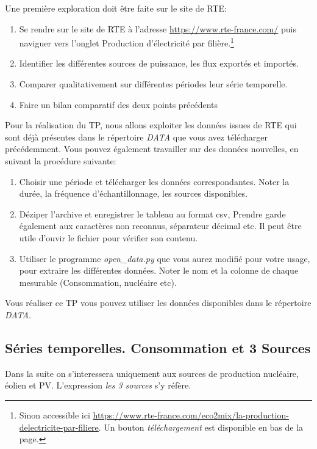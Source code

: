 \documentclass[12pt,a4,french]{article}
\newcommand{\tmtextit}[1]{{\itshape{#1}}}
\begin{document}
Une première exploration doit être faite sur le site de RTE:
\begin{enumerate}
  \item Se rendre sur le site de RTE à l'adresse 
  \href{https://www.rte-france.com/}{https://www.rte-france.com/} puis naviguer vers l'onglet Production d'électricité par filière.\footnote{Sinon accessible ici \href{https://www.rte-france.com/eco2mix/la-production-delectricite-par-filiere}{https://www.rte-france.com/eco2mix/la-production-delectricite-par-filiere}. Un bouton \textit{téléchargement} est disponible en bas de la page.}
  
  \item Identifier les différentes sources de puissance, les flux exportés et importés.
  
  \item Comparer qualitativement sur différentes périodes leur série temporelle.
  
  \item Faire un bilan comparatif des deux points précédents
\end{enumerate}

Pour la réalisation du TP, nous allons exploiter les données issues de RTE qui sont déjà présentes dans le répertoire \textit{DATA} que vous avez télécharger précédemment. Vous pouvez également travailler sur des données nouvelles, en suivant la procédure suivante:
  \begin{enumerate}  
  \item Choisir une période et télécharger les données
  correspondantes. Noter la durée, la fréquence d'échantillonnage, les
  sources disponibles. 
  
  \item Déziper l'archive et enregistrer le
  tableau au format csv, Prendre garde également aux caractères non   reconnus, séparateur décimal etc. Il peut être utile d'ouvir le fichier pour vérifier son contenu.
  
  \item Utiliser le programme \tmtextit{open\_data.py} que vous aurez modifié
  pour votre usage, pour extraire les différentes données. Noter le nom et
  la colonne de chaque mesurable (Consommation, nucléaire etc). 
\end{enumerate}

Vous réaliser ce TP vous pouvez utiliser les données disponibles dans le répertoire \tmtextit{DATA}.



\subsection{Séries temporelles. Consommation et 3 Sources} \label{serie_temporelle}
Dans la suite on s'interessera uniquement aux sources de production
nucléaire, éolien et PV. L'expression \tmtextit{les 3 sources} s'y
réfère.
\end{document}
